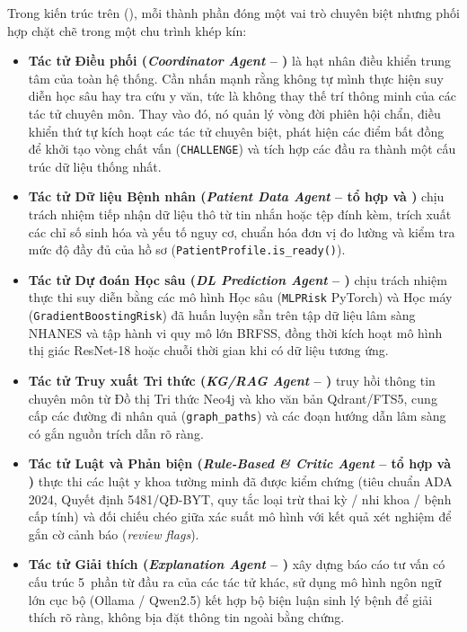 Trong kiến trúc trên (), mỗi thành phần đóng một vai trò chuyên biệt nhưng phối hợp chặt chẽ trong một chu trình khép kín:
\begin{itemize}
  \item \textbf{Tác tử Điều phối (\emph{Coordinator Agent} -- )} là hạt nhân điều khiển trung tâm của toàn hệ thống. Cần nhấn mạnh rằng  không tự mình thực hiện suy diễn học sâu hay tra cứu y văn, tức là không thay thế trí thông minh của các tác tử chuyên môn. Thay vào đó, nó quản lý vòng đời phiên hội chẩn, điều khiển thứ tự kích hoạt các tác tử chuyên biệt, phát hiện các điểm bất đồng để khởi tạo vòng chất vấn (\texttt{CHALLENGE}) và tích hợp các đầu ra thành một cấu trúc dữ liệu thống nhất.
  \item \textbf{Tác tử Dữ liệu Bệnh nhân (\emph{Patient Data Agent} -- tổ hợp  và )} chịu trách nhiệm tiếp nhận dữ liệu thô từ tin nhắn hoặc tệp đính kèm, trích xuất các chỉ số sinh hóa và yếu tố nguy cơ, chuẩn hóa đơn vị đo lường và kiểm tra mức độ đầy đủ của hồ sơ (\texttt{PatientProfile.is\_ready()}).
  \item \textbf{Tác tử Dự đoán Học sâu (\emph{DL Prediction Agent} -- )} chịu trách nhiệm thực thi suy diễn bằng các mô hình Học sâu (\texttt{MLPRisk} PyTorch) và Học máy (\texttt{GradientBoostingRisk}) đã huấn luyện sẵn trên tập dữ liệu lâm sàng NHANES và tập hành vi quy mô lớn BRFSS, đồng thời kích hoạt mô hình thị giác ResNet-18 hoặc chuỗi thời gian  khi có dữ liệu tương ứng.
  \item \textbf{Tác tử Truy xuất Tri thức (\emph{KG/RAG Agent} -- )} truy hồi thông tin chuyên môn từ Đồ thị Tri thức Neo4j và kho văn bản Qdrant/FTS5, cung cấp các đường đi nhân quả (\texttt{graph\_paths}) và các đoạn hướng dẫn lâm sàng có gắn nguồn trích dẫn rõ ràng.
  \item \textbf{Tác tử Luật và Phản biện (\emph{Rule-Based \& Critic Agent} -- tổ hợp  và )} thực thi các luật y khoa tường minh đã được kiểm chứng (tiêu chuẩn ADA 2024, Quyết định 5481/QĐ-BYT, quy tắc loại trừ thai kỳ / nhi khoa / bệnh cấp tính) và đối chiếu chéo giữa xác suất mô hình với kết quả xét nghiệm để gắn cờ cảnh báo (\emph{review flags}).
  \item \textbf{Tác tử Giải thích (\emph{Explanation Agent} -- )} xây dựng báo cáo tư vấn có cấu trúc 5~phần từ đầu ra của các tác tử khác, sử dụng mô hình ngôn ngữ lớn cục bộ (Ollama / Qwen2.5) kết hợp bộ biện luận sinh lý bệnh để giải thích rõ ràng, không bịa đặt thông tin ngoài bằng chứng.

\end{itemize}
